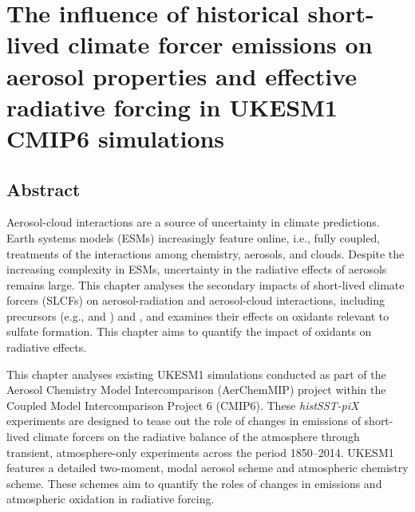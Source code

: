 \chapter{The influence of historical short-lived climate forcer emissions on aerosol properties and effective radiative forcing in UKESM1 CMIP6 simulations}
\label{ch3:title}

\section*{Abstract}

Aerosol-cloud interactions are a source of uncertainty in climate predictions. Earth systems models (ESMs) increasingly feature online, i.e., fully coupled, treatments of the interactions among chemistry, aerosols, and clouds. Despite the increasing complexity in ESMs, uncertainty in the radiative effects of aerosols remains large. This chapter analyses the secondary impacts of short-lived climate forcers (SLCFs) on aerosol-radiation and aerosol-cloud interactions, including  precursors (e.g.,  and ) and , and examines their effects on oxidants relevant to sulfate formation. This chapter aims to quantify the impact of oxidants on radiative effects. 

This chapter analyses existing UKESM1 simulations conducted as part of the Aerosol Chemistry Model Intercomparison (AerChemMIP) project within the Coupled Model Intercomparison Project 6 (CMIP6). These \textit{histSST-piX} experiments are designed to tease out the role of changes in emissions of short-lived climate forcers on the radiative balance of the atmosphere through transient, atmosphere-only experiments across the period 1850--2014. UKESM1 features a detailed two-moment, modal aerosol scheme and atmospheric chemistry scheme. These schemes aim to quantify the roles of changes in emissions and atmospheric oxidation in radiative forcing.

